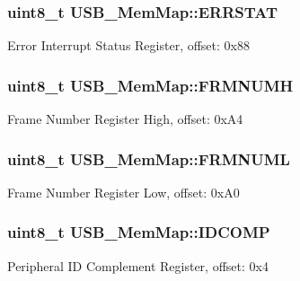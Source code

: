 \subsubsection[{E\+R\+R\+S\+T\+A\+T}]{\setlength{\rightskip}{0pt plus 5cm}uint8\+\_\+t U\+S\+B\+\_\+\+Mem\+Map\+::\+E\+R\+R\+S\+T\+A\+T}\label{struct_u_s_b___mem_map_ad86f18ee95df11168d4b6cf68578e0fa}
Error Interrupt Status Register, offset\+: 0x88 \hypertarget{struct_u_s_b___mem_map_a9df319e9feb132fdd9caa55264acfc30}{}
\subsubsection[{F\+R\+M\+N\+U\+M\+H}]{\setlength{\rightskip}{0pt plus 5cm}uint8\+\_\+t U\+S\+B\+\_\+\+Mem\+Map\+::\+F\+R\+M\+N\+U\+M\+H}\label{struct_u_s_b___mem_map_a9df319e9feb132fdd9caa55264acfc30}
Frame Number Register High, offset\+: 0x\+A4 \hypertarget{struct_u_s_b___mem_map_a13d399a89566e622c5de92668f520768}{}
\subsubsection[{F\+R\+M\+N\+U\+M\+L}]{\setlength{\rightskip}{0pt plus 5cm}uint8\+\_\+t U\+S\+B\+\_\+\+Mem\+Map\+::\+F\+R\+M\+N\+U\+M\+L}\label{struct_u_s_b___mem_map_a13d399a89566e622c5de92668f520768}
Frame Number Register Low, offset\+: 0x\+A0 \hypertarget{struct_u_s_b___mem_map_a87d65236c6baf792a723600b0623eca5}{}
\subsubsection[{I\+D\+C\+O\+M\+P}]{\setlength{\rightskip}{0pt plus 5cm}uint8\+\_\+t U\+S\+B\+\_\+\+Mem\+Map\+::\+I\+D\+C\+O\+M\+P}\label{struct_u_s_b___mem_map_a87d65236c6baf792a723600b0623eca5}
Peripheral I\+D Complement Register, offset\+: 0x4 \hypertarget{struct_u_s_b___mem_map_aa19462850c5085330e53ed19397f6e1e}{}
